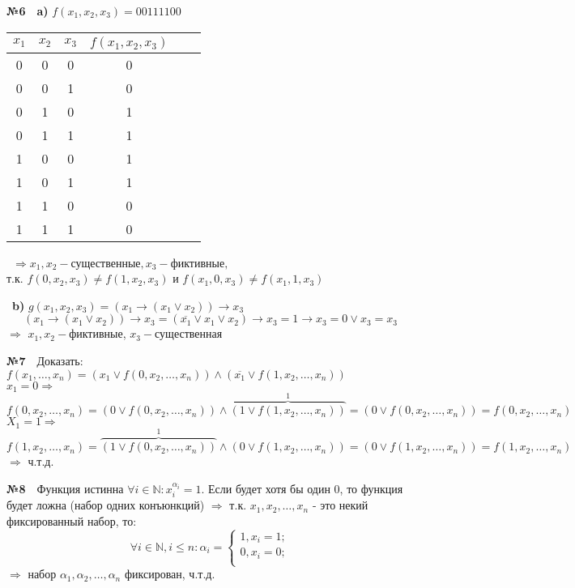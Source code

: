 \documentclass[a4paper, 12pt]{article}
\begin{document}
	\textbf{№6}\
	\
	\textbf{a)} $f(x_1,x_2, x_3) = 00111100$
	\begin{table}[H]
	\centering	
	\begin{tabular}{|c|c|c|c|c|c|}
		\hline
		$x_1$ & $x_2$ & $x_3$ & $f(x_1,x_2, x_3)$ \\ \hline
		0 & 0 & 0 & 0 \\ \hline
		0 & 0 & 1 & 0 \\ \hline
		0 & 1 & 0 & 1 \\ \hline
		0 & 1 & 1 & 1 \\ \hline	
		1 & 0 & 0 & 1 \\ \hline
		1 & 0 & 1 & 1 \\ \hline
		1 & 1 & 0 & 0 \\ \hline
		1 & 1 & 1 & 0 \\ \hline
	\end{tabular}
	\
	$\Rightarrow x_1, x_2 - \text{существенные}, x_3 - \text{фиктивные,}$
	\\
	т.к. $f(0, x_2, x_3) \not= f(1, x_2, x_3)$ и $f(x_1, 0, x_3) \not= f(x_1, 1, x_3)$
	\end{table}
	\
	\textbf{b)} $g(x_1, x_2, x_3) = (x_1 \rightarrow (x_1 \vee x_2)) \rightarrow x_3$
	\[
		(x_1 \rightarrow (x_1 \vee x_2)) \rightarrow x_3 = (\overline{x_1} \vee x_1 \vee x_2) \rightarrow x_3 = 1 \rightarrow x_3 = 0 \vee x_3 = x_3
	\]
	$\Rightarrow$ $x_1, x_2 - \text{фиктивные}$, $x_3 - \text{существенная}$ 
	
	\textbf{№7}\
	\
	Доказать: $f(x_1, \dots, x_n) = (x_1 \vee f(0, x_2, \dots, x_n)) \wedge (\overline{x_1} \vee f(1, x_2, \dots, x_n))$
	\\
	$x_1 = 0 \Rightarrow$
	\[
		f(0, x_2, \dots, x_n) = (0 \vee f(0, x_2, \dots, x_n)) \wedge \overbrace{(1 \vee f(1, x_2, \dots, x_n))}^{1} = (0 \vee f(0, x_2, \dots, x_n)) = f(0, x_2, \dots, x_n)
	\]
	$X_1 = 1 \Rightarrow$
	\[
		f(1, x_2, \dots, x_n) = \overbrace{(1 \vee f(0, x_2, \dots, x_n))}^{1} \wedge (0 \vee f(1, x_2, \dots, x_n)) = (0 \vee f(1, x_2, \dots, x_n)) = f(1, x_2, \dots, x_n)	
	\]
	$\Rightarrow$ ч.т.д.
	
	\textbf{№8}\
	\
	Функция истинна $\forall i \in \mathbb{N}: x_{i}^{\alpha_i} = 1$. Если будет хотя бы один 0, то функция будет ложна (набор одних конъюнкций) $\Rightarrow$ т.к. $x_1, x_2, \dots, x_n$ - это некий фиксированный набор, то:
	\[
		\forall i \in \mathbb{N}, i \leq n: \alpha_i =
		\left\{
			\begin{gathered}
			1, x_i = 1; \\
			0, x_i = 0; \\
			\end{gathered}
		\right. 
	\]
	$\Rightarrow$ набор $\alpha_1, \alpha_2, \dots, \alpha_n$ фиксирован, ч.т.д. 
	
	
			
\end{document}
